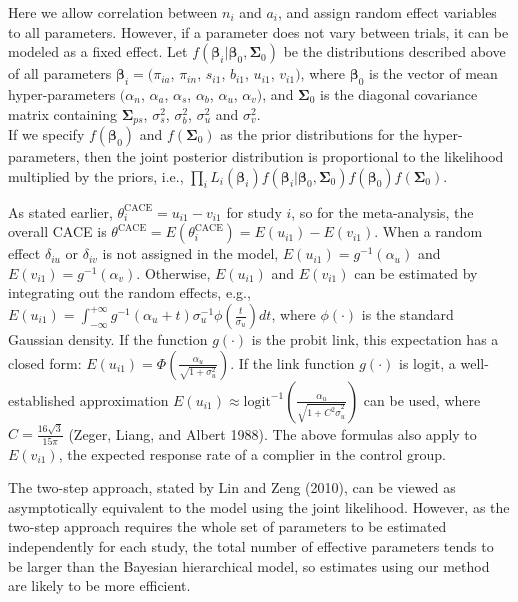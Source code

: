 Here we allow correlation between \(n_i\) and \(a_i\), and assign random effect variables to all parameters. However, if a parameter does not vary between trials, it can be modeled as a fixed effect.
Let \(f(\boldsymbol{\beta}_i | \boldsymbol{\beta}_0, \mathbf{\Sigma}_0)\) be the distributions described above of all parameters \(\boldsymbol{\beta}_i=(\pi_{ia}\), \(\pi_{in}\), \(s_{i1}\), \(b_{i1}\), \(u_{i1}\), \(v_{i1})\), where \(\boldsymbol{\beta}_0\) is the vector of mean hyper-parameters \((\alpha_{n}\), \(\alpha_{a}\), \(\alpha_s\), \(\alpha_b\), \(\alpha_u\), \(\alpha_v)\), and \(\mathbf{\Sigma}_0\) is the diagonal covariance matrix containing \({\mathbf{\Sigma}}_{ps}\), \({\sigma}^{2}_s\), \({\sigma}^{2}_b\), \({\sigma}^{2}_u\) and \({\sigma}^{2}_v\).\\
If we specify \(f({\boldsymbol{\beta}_0})\) and \(f({\mathbf{\Sigma}_0})\) as the prior distributions for the hyper-parameters, then the joint posterior distribution is proportional to the likelihood multiplied by the priors, i.e., \(\prod_i {L_i({\boldsymbol{\beta}}_{i})} f({\boldsymbol{\beta}}_{i} | \boldsymbol{\beta}_0, {\mathbf{\Sigma}}_0) f({\boldsymbol{\beta}}_0 ) f({\mathbf{\Sigma}}_0)\).

As stated earlier, \(\theta^\text{CACE}_i=u_{i1}-v_{i1}\) for study \(i\), so for the meta-analysis, the overall CACE is \(\theta^\text{CACE}=E(\theta^\text{CACE}_i)=E(u_{i1})-E(v_{i1})\). When a random effect \(\delta_{iu}\) or \(\delta_{iv}\) is not assigned in the model, \(E(u_{i1})=g^{-1}(\alpha_u)\) and \(E(v_{i1})=g^{-1}(\alpha_v)\). Otherwise, \(E(u_{i1})\) and \(E(v_{i1})\) can be estimated by integrating out the random effects, e.g., \(E(u_{i1})=\int^{+\infty }_{-\infty }{g^{-1}(\alpha_u+t)}\sigma^{-1}_u \phi (\frac{t}{\sigma_u})dt\), where \(\phi(\cdot)\) is the standard Gaussian density. If the function \(g(\cdot)\) is the probit link, this expectation has a closed form: \(E(u_{i1})= \Phi(\frac{\alpha_u}{\sqrt{1+{\sigma}^2_u}})\). If the link function \(g(\cdot)\) is logit, a well-established approximation \(E(u_{i1}) \approx \text{logit}^{-1}(\frac{\alpha_u}{\sqrt{1+{C^2\sigma}^2_u}})\) can be used, where \(C=\frac{16\sqrt{3}}{15\pi}\) (Zeger, Liang, and Albert 1988). The above formulas also apply to \(E(v_{i1})\), the expected response rate of a complier in the control group.

The two-step approach, stated by Lin and Zeng (2010), can be viewed as asymptotically equivalent to the model using the joint likelihood. However, as the two-step approach requires the whole set of parameters to be estimated independently for each study, the total number of effective parameters tends to be larger than the Bayesian hierarchical model, so estimates using our method are likely to be more efficient.

